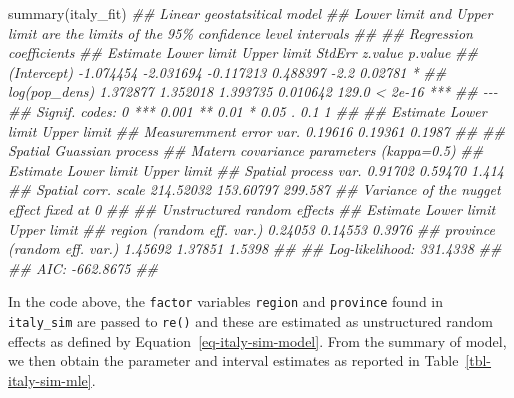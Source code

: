 \documentclass[
  letterpaper,
]{krantz}
\newenvironment{Shaded}{\begin{snugshade}}{\end{snugshade}}
\newcommand{\DocumentationTok}[1]{\textcolor[rgb]{0.37,0.37,0.37}{\textit{#1}}}
\newcommand{\FunctionTok}[1]{\textcolor[rgb]{0.28,0.35,0.67}{#1}}
\newcommand{\NormalTok}[1]{\textcolor[rgb]{0.00,0.23,0.31}{#1}}
\begin{document}
\begin{Shaded}
\begin{Highlighting}[]
\FunctionTok{summary}\NormalTok{(italy\_fit)}
\DocumentationTok{\#\# Linear geostatsitical model }
\DocumentationTok{\#\# \textquotesingle{}Lower limit\textquotesingle{} and \textquotesingle{}Upper limit\textquotesingle{} are the limits of the 95\% confidence level intervals }
\DocumentationTok{\#\# }
\DocumentationTok{\#\#  Regression coefficients }
\DocumentationTok{\#\#                Estimate Lower limit Upper limit    StdErr z.value p.value    }
\DocumentationTok{\#\# (Intercept)   {-}1.074454   {-}2.031694   {-}0.117213  0.488397    {-}2.2 0.02781 *  }
\DocumentationTok{\#\# log(pop\_dens)  1.372877    1.352018    1.393735  0.010642   129.0 \textless{} 2e{-}16 ***}
\DocumentationTok{\#\# {-}{-}{-}}
\DocumentationTok{\#\# Signif. codes:  0 \textquotesingle{}***\textquotesingle{} 0.001 \textquotesingle{}**\textquotesingle{} 0.01 \textquotesingle{}*\textquotesingle{} 0.05 \textquotesingle{}.\textquotesingle{} 0.1 \textquotesingle{} \textquotesingle{} 1}
\DocumentationTok{\#\# }
\DocumentationTok{\#\#                          Estimate Lower limit Upper limit}
\DocumentationTok{\#\# Measuremment error var.  0.19616     0.19361      0.1987}
\DocumentationTok{\#\# }
\DocumentationTok{\#\#  Spatial Guassian process }
\DocumentationTok{\#\# Matern covariance parameters (kappa=0.5) }
\DocumentationTok{\#\#                       Estimate Lower limit Upper limit}
\DocumentationTok{\#\# Spatial process var.   0.91702     0.59470       1.414}
\DocumentationTok{\#\# Spatial corr. scale  214.52032   153.60797     299.587}
\DocumentationTok{\#\# Variance of the nugget effect fixed at 0 }
\DocumentationTok{\#\# }
\DocumentationTok{\#\#  Unstructured random effects }
\DocumentationTok{\#\#                             Estimate Lower limit Upper limit}
\DocumentationTok{\#\# region (random eff. var.)    0.24053     0.14553      0.3976}
\DocumentationTok{\#\# province (random eff. var.)  1.45692     1.37851      1.5398}
\DocumentationTok{\#\# }
\DocumentationTok{\#\#  Log{-}likelihood: 331.4338}
\DocumentationTok{\#\# }
\DocumentationTok{\#\#  AIC: {-}662.8675}
\DocumentationTok{\#\# }
\end{Highlighting}
\end{Shaded}

In the code above, the \texttt{factor} variables \texttt{region} and
\texttt{province} found in \texttt{italy\_sim} are passed to
\texttt{re()} and these are estimated as unstructured random effects as
defined by Equation~\ref{eq-italy-sim-model}. From the summary of model,
we then obtain the parameter and interval estimates as reported in
Table~\ref{tbl-italy-sim-mle}.
\end{document}
